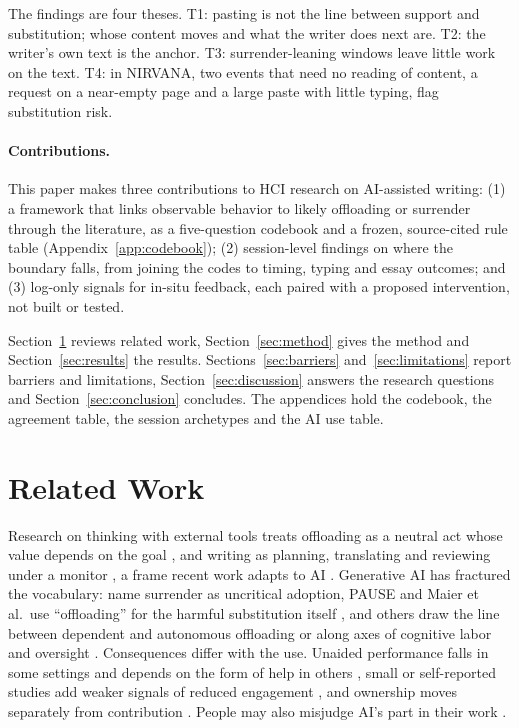 \documentclass[manuscript,screen]{acmart}
\begin{document}
The findings are four theses. T1: pasting is not the line between support and substitution; whose content moves and what the writer does next are. T2: the writer's own text is the anchor. T3: surrender-leaning windows leave little work on the text. T4: in NIRVANA, two events that need no reading of content, a request on a near-empty page and a large paste with little typing, flag substitution risk.

\paragraph{Contributions.} This paper makes three contributions to HCI research on AI-assisted writing: (1) a framework that links observable behavior to likely offloading or surrender through the literature, as a five-question codebook and a frozen, source-cited rule table (Appendix~\ref{app:codebook}); (2) session-level findings on where the boundary falls, from joining the codes to timing, typing and essay outcomes; and (3) log-only signals for in-situ feedback, each paired with a proposed intervention, not built or tested.

Section~\ref{sec:related} reviews related work, Section~\ref{sec:method} gives the method and Section~\ref{sec:results} the results. Sections~\ref{sec:barriers} and~\ref{sec:limitations} report barriers and limitations, Section~\ref{sec:discussion} answers the research questions and Section~\ref{sec:conclusion} concludes. The appendices hold the codebook, the agreement table, the session archetypes and the AI use table.

\section{Related Work}
\label{sec:related}

Research on thinking with external tools treats offloading as a neutral act whose value depends on the goal \cite{risko2016}, and writing as planning, translating and reviewing under a monitor \cite{flower1981}, a frame recent work adapts to AI \cite{yukita2025,wan2024}. Generative AI has fractured the vocabulary: \citet{shaw2026} name surrender as uncritical adoption, PAUSE and Maier et al.\ use ``offloading'' for the harmful substitution itself \cite{alam2026,maier2026}, and others draw the line between dependent and autonomous offloading \cite{zhu2026} or along axes of cognitive labor and oversight \cite{kim2025arcp}. Consequences differ with the use. Unaided performance falls in some settings \cite{bastani2025} and depends on the form of help in others \cite{maier2026,contractor2026}, small or self-reported studies add weaker signals of reduced engagement \cite{kosmyna2025,lee2025}, and ownership moves separately from contribution \cite{joshi2025,park2026,jelson2026chi}. People may also misjudge AI's part in their work \cite{kim2026fallacy,skulmowski2024,tankelevitch2024,bhat2026}.
\end{document}
